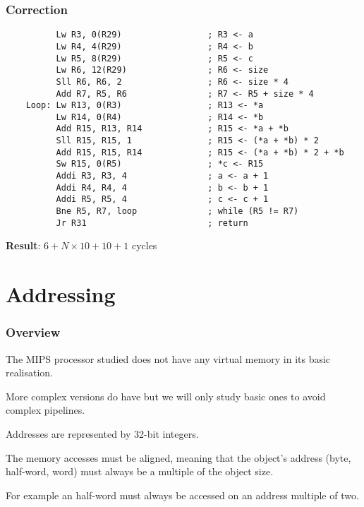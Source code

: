 \begin{frame}[containsverbatim]
  \frametitle{Correction}

  \begin{verbatim}
          Lw R3, 0(R29)                 ; R3 <- a
          Lw R4, 4(R29)                 ; R4 <- b
          Lw R5, 8(R29)                 ; R5 <- c
          Lw R6, 12(R29)                ; R6 <- size
          Sll R6, R6, 2                 ; R6 <- size * 4
          Add R7, R5, R6                ; R7 <- R5 + size * 4
    Loop: Lw R13, 0(R3)                 ; R13 <- *a
          Lw R14, 0(R4)                 ; R14 <- *b
          Add R15, R13, R14             ; R15 <- *a + *b
          Sll R15, R15, 1               ; R15 <- (*a + *b) * 2
          Add R15, R15, R14             ; R15 <- (*a + *b) * 2 + *b
          Sw R15, 0(R5)                 ; *c <- R15
          Addi R3, R3, 4                ; a <- a + 1
          Addi R4, R4, 4                ; b <- b + 1
          Addi R5, R5, 4                ; c <- c + 1
          Bne R5, R7, loop              ; while (R5 != R7)
          Jr R31                        ; return
  \end{verbatim}

  \textbf{Result}: $6 + N \times 10 + 10 + 1$ cycles
\end{frame}

%
%

\section{Addressing}


\begin{frame}
  \frametitle{Overview}

  The MIPS processor studied does not have any virtual memory in its basic
  realisation.

  \-

  More complex versions do have but we will only study basic ones to
  avoid complex pipelines.

  \-

  Addresses are represented by 32-bit integers.

  \-

  The memory accesses must be aligned, meaning that the object's address
  (byte, half-word, word) must always be a multiple of the object size.

  \-

  For example an half-word must always be accessed on an address multiple
  of two.
\end{frame}

